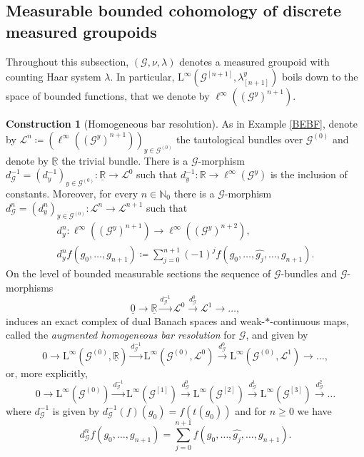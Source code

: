 \documentclass[11pt, oneside]{amsart}
\theoremstyle{definition}
\newtheorem{con}[lemma]{Construction}
\theoremstyle{remark}
\theoremstyle{TheoremNum}
\newcommand{\Linf}{\mathrm{L}^{\infty}}
\newcommand{\cG}{\mathcal{G}}
\newcommand{\bR}{\mathbb{R}}
\newcommand{\cL}{\mathcal L}
\newcommand{\bN}{\mathbb N}
\begin{document}
\subsection{Measurable bounded cohomology of discrete measured groupoids}\label{sec2.5}
Throughout this subsection, $(\cG, \nu, \lambda)$ denotes a measured groupoid with counting Haar system $\lambda$. 
In particular, $\Linf(\mathcal{G}^{[n+1]}, \lambda^y_{[n+1]})$ boils down to the space of bounded functions, that we denote by 
$\ell^\infty((\cG^y)^{n+1})$.
\begin{con}[Homogeneous bar resolution] 
As in Example \ref{BEBF}, denote by $\cL^n \coloneqq   (\ell^\infty((\cG^y)^{n+1}))_{y\in \mathcal{G}^{(0)}}$ the tautological bundles over $\cG^{(0)}$ and denote by $\underline{\bR}$ the trivial bundle. There is a $\cG$-morphism $d_{\cG}^{-1} = (d_{y}^{-1})_{y \in \cG^{(0)}}: \underline{\bR} \to \cL^0$ such that $d_y^{-1}: \bR \to \ell^\infty(\cG^y)$ is the inclusion of constants. Moreover, for every $n \in \bN_0$ there is a $\cG$-morphism $d_{\cG}^n = (d_{y}^{n})_{y \in \cG^{(0)}}: \cL^n \to \cL^{n+1}$ such that
\begin{gather*}
  d_y^n: \ell^\infty((\cG^y)^{n+1}) \to  \ell^\infty((\cG^y)^{n+2}), \\ d_y^nf(g_0, \dots, g_{n+1}) \coloneqq    \sum_{j=0}^{n+1} (-1)^j f(g_0, \dots, \widehat{g_j}, \dots, g_{n+1}).
\end{gather*}
On the level of bounded measurable sections the sequence of $\cG$-bundles and $\cG$-morphisms
\begin{equation}\label{StdRes}
\underline{0} \to \underline{\bR} \xrightarrow{d_{\cG}^{-1}} \cL^0 \xrightarrow{d_{\cG}^{0}} \cL^1 \to \dots,
\end{equation}
induces an exact complex of dual Banach spaces and weak-$*$-continuous maps, called the \emph{augmented homogeneous bar resolution} for $\cG$, and given by
\[
0 \to  \Linf(\cG^{(0)},\underline{\bR}) \xrightarrow{d_{\cG}^{-1}} \Linf(\cG^{(0)}, \cL^0) \xrightarrow{d_{\cG}^{0}} \Linf(\cG^{(0)}, \cL^1) \to \dots,
\]
or, more explicitly,
\begin{equation*}\label{AugmentedStandardResolution}
0 \to \Linf(\cG^{(0)}) \xrightarrow{d_{\cG}^{-1}}  \Linf(\cG^{[1]})  \xrightarrow{d_{\cG}^0} \Linf(\cG^{[2]})  \xrightarrow{d_{\cG}^1} \Linf(\cG^{[3]})  \xrightarrow{d_{\cG}^2}  \dots
\end{equation*}
where $d_{\cG}^{{-1}}$ is given by $d_{\cG}^{-1}(f)(g_0) = f(t(g_0))$ and for $n \geq 0$ we have
\[
d_{\cG}^n f(g_0, \dots, g_{n+1}) = \sum_{j=0}^{n+1} f(g_0, \dots, \widehat{g_j}, \dots, g_{n+1}).
\]
\end{con}
\end{document}

